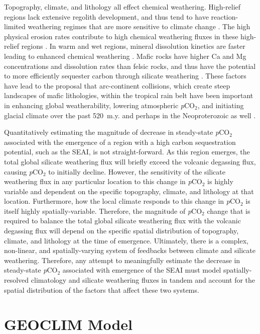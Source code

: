 \documentclass[9pt,twocolumn,twoside,lineno]{pnas-new}
\newcommand{\pCOtwo}{\textit{p}CO$_{2}$\xspace}
\begin{document}
Topography, climate, and lithology all effect chemical weathering. High-relief regions lack extensive regolith development, and thus tend to have reaction-limited weathering regimes that are more sensitive to climate change \cite{Gabet2009a, West2012a, Maher2014a}. The high physical erosion rates contribute to high chemical weathering fluxes in these high-relief regions \citep{Godderis2017b}. In warm and wet regions, mineral dissolution kinetics are faster leading to enhanced chemical weathering \cite{Lasaga1994a, West2012a}. Mafic rocks have higher Ca and Mg concentrations and dissolution rates than felsic rocks, and thus have the potential to more efficiently sequester carbon through silicate weathering \cite{Dessert2003a}. These factors have lead to the proposal that arc-continent collisions, which create steep landscapes of mafic lithologies, within the tropical rain belt have been important in enhancing global weatherability, lowering atmospheric \pCOtwo, and initiating glacial climate over the past 520~m.y. \cite{Jagoutz2016a, Swanson-Hysell2017a, Macdonald2019a} and perhaps in the Neoproterozoic as well \cite{Park2019b}.

Quantitatively estimating the magnitude of decrease in steady-state \pCOtwo associated with the emergence of a region with a high carbon sequestration potential, such as the SEAI, is not straight-forward. As this region emerges, the total global silicate weathering flux will briefly exceed the volcanic degassing flux, causing \pCOtwo to initially decline. However, the sensitivity of the silicate weathering flux in any particular location to this change in \pCOtwo is highly variable and dependent on the specific topography, climate, and lithology at that location. Furthermore, how the local climate responds to this change in \pCOtwo is itself highly spatially-variable. Therefore, the magnitude of \pCOtwo change that is required to balance the total global silicate weathering flux with the volcanic degassing flux will depend on the specific spatial distribution of topography, climate, and lithology at the time of emergence. Ultimately, there is a complex, non-linear, and spatially-varying system of feedbacks between climate and silicate weathering. Therefore, any attempt to meaningfully estimate the decrease in steady-state \pCOtwo associated with emergence of the SEAI must model spatially-resolved climatology and silicate weathering fluxes in tandem and account for the spatial distribution of the factors that affect these two systems.

\section*{GEOCLIM Model}
\end{document}
